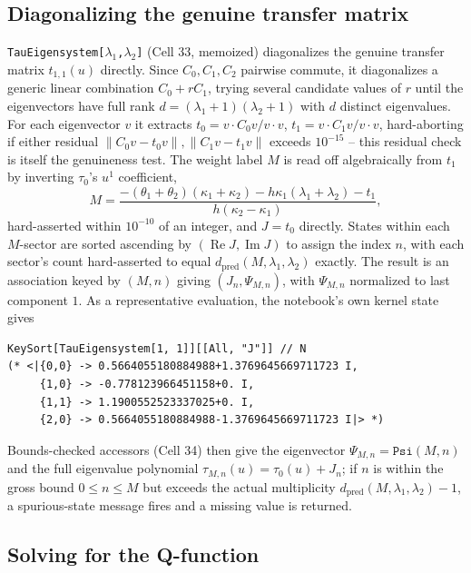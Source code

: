 \documentclass[11pt]{article}
\begin{document}
\subsection*{Diagonalizing the genuine transfer matrix}

\texttt{TauEigensystem[$\lambda_1$,$\lambda_2$]} (Cell 33, memoized) diagonalizes the genuine
transfer matrix $t_{1,1}(u)$ directly. Since $C_0,C_1,C_2$ pairwise commute, it diagonalizes a
generic linear combination $C_0+rC_1$, trying several candidate values of $r$ until the eigenvectors
have full rank $d=(\lambda_1+1)(\lambda_2+1)$ with $d$ distinct eigenvalues. For each eigenvector
$v$ it extracts $t_0 = v\cdot C_0 v/v\cdot v$, $t_1 = v\cdot C_1 v/v\cdot v$, hard-aborting if either
residual $\|C_0v-t_0v\|,\|C_1v-t_1v\|$ exceeds $10^{-15}$ -- this residual check is itself the
genuineness test. The weight label $M$ is read off algebraically from $t_1$ by inverting $\tau_0$'s
$u^1$ coefficient,
\begin{equation}
  M = \frac{-(\theta_1+\theta_2)(\kappa_1+\kappa_2) - h\kappa_1(\lambda_1+\lambda_2) - t_1}
           {h(\kappa_2-\kappa_1)},
  \label{eq:Mextract}
\end{equation}
hard-asserted within $10^{-10}$ of an integer, and $J=t_0$ directly. States within each $M$-sector
are sorted ascending by $(\operatorname{Re}J,\operatorname{Im}J)$ to assign the index $n$, with
each sector's count hard-asserted to equal $d_{\mathrm{pred}}(M,\lambda_1,\lambda_2)$ exactly. The
result is an association keyed by $(M,n)$ giving $(J_n,\Psi_{M,n})$, with $\Psi_{M,n}$ normalized to
last component $1$. As a representative evaluation, the notebook's own kernel state gives
\begin{verbatim}
KeySort[TauEigensystem[1, 1]][[All, "J"]] // N
(* <|{0,0} -> 0.5664055180884988+1.3769645669711723 I,
     {1,0} -> -0.778123966451158+0. I,
     {1,1} -> 1.1900552523337025+0. I,
     {2,0} -> 0.5664055180884988-1.3769645669711723 I|> *)
\end{verbatim}

Bounds-checked accessors (Cell 34) then give the eigenvector $\Psi_{M,n}=\texttt{Psi}(M,n)$ and the
full eigenvalue polynomial $\tau_{M,n}(u)=\tau_0(u)+J_n$; if $n$ is within the gross bound
$0\le n\le M$ but exceeds the actual multiplicity $d_{\mathrm{pred}}(M,\lambda_1,\lambda_2)-1$, a
spurious-state message fires and a missing value is returned.

\subsection*{Solving for the Q-function}
\end{document}
